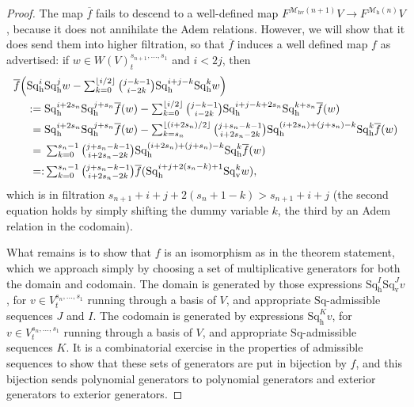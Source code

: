 \documentclass[11pt]{amsart} \renewcommand{\baselinestretch}{1.4}
\theoremstyle{plain}
\theoremstyle{definition}
\renewcommand{\to}{\longrightarrow}
\newcommand{\calMh}{\mathcal{M}\dhor}
\newcommand{\calMhv}{\mathcal{M}_\mathrm{hv}}
\newcommand{\Sq}{\mathrm{Sq}}
\newcommand{\dver}{_\mathrm{v}}
\newcommand{\dhor}{_\mathrm{h}}
\newcommand{\Sqh}{\mathrm{Sq}\dhor}
\newcommand{\Sqv}{\mathrm{Sq}\dver}
\begin{document}
\begin{Cohomology Operations for W and U}
\begin{proof}
The map $\overline{f}$ fails to descend to a well-defined map  $F^{\calMhv(n+1)}V\to F^{\calMh(n)}V$, because it does not annihilate the Adem relations. However, we will show that it does send them into higher filtration, so that $\overline{f}$ induces a well defined map $f$ as advertised: if $w\in W(V)^{s_{n+1},\ldots,s_1}_t$ and $i<2j$, then
\begin{alignat*}{2}
\overline{f}\Bigl(\Sqh^i&\Sqh^jw-\textstyle\sum_{k=0}^{\lfloor i/2\rfloor}{j-k-1\choose i-2k}\Sqh^{i+j-k}\Sqh^{k}w\Bigr)\\
{}:={}&\Sqh^{i+2s_n}\Sqh^{j+s_n}\overline{f}(w)-\textstyle\sum_{k=0}^{\lfloor i/2\rfloor}{j-k-1\choose i-2k}\Sqh^{i+j-k+2s_n}\Sqh^{k+s_n}\overline{f}(w)\\
{}={}&
\Sqh^{i+2s_n}\Sqh^{j+s_n}\overline{f}(w)-\textstyle\sum_{k=s_n}^{\lfloor (i+2s_n)/2\rfloor}{j+s_n-k-1\choose i+2s_n-2k}\Sqh^{(i+2s_n)+(j+s_n)-k}\Sqh^{k}\overline{f}(w)\\
{}={}&\textstyle\sum_{k=0}^{s_n-1}{j+s_n-k-1\choose i+2s_n-2k}\Sqh^{(i+2s_n)+(j+s_n)-k}\Sqh^{k}\overline{f}(w)\\
{}=\makebox[0cm][r]{$:$}{}&\textstyle\sum_{k=0}^{s_n-1}{j+s_n-k-1\choose i+2s_n-2k}\overline{f}(\Sqh^{i+j+2(s_n-k)+1}\Sqv^{k}w),
\end{alignat*}
which is in filtration $s_{n+1}+i+j+2(s_n+1-k)>s_{n+1}+i+j$ (the second equation holds by simply shifting the dummy variable $k$, the third by an Adem relation in the codomain).

What remains is to show that $f$ is an isomorphism as in the theorem statement, which we approach simply by choosing a set of multiplicative generators for both the domain and codomain. The domain is generated by those expressions $\Sqh^I\Sqv^Jv$, for $v\in V^{s_{n},\ldots,s_1}_t$ running through a basis of $V$, and appropriate $\Sq$-admissible sequences $J$ and $I$. The codomain is generated by expressions $\Sqh^Kv$, for $v\in V^{s_{n},\ldots,s_1}_t$ running through a basis of $V$, and appropriate $\Sq$-admissible sequences $K$. It is a  combinatorial  exercise in the properties of admissible sequences to show that these sets of generators are put in bijection by $f$, and this bijection sends polynomial generators to polynomial generators and exterior generators to exterior generators.
\end{proof}
\end{Cohomology Operations for W and U}
\end{document}
